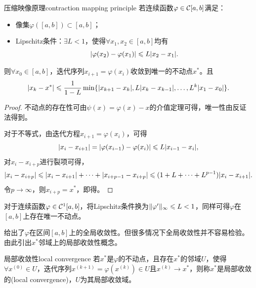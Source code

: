 \begin{theorem}
    {压缩映像原理}{contraction mapping principle}
    若连续函数$\varphi \in \mathcal{C}[a,b]$满足：
    \begin{itemize}
        \item 像集$\varphi([a,b]) \subset [a,b]$；
        \item Lipschitz条件：$\exists L < 1$，使得$\forall x_1,x_2 \in [a,b]$均有
        \begin{equation}\label{eq:na-contraction-condition}
            \lvert\varphi(x_2) - \varphi(x_1)\rvert \leqslant L\lvert x_2 - x_1\rvert.
        \end{equation}
    \end{itemize}
    则$\forall x_0 \in [a,b]$，迭代序列$x_{i+1} = \varphi(x_i)$收敛到唯一的不动点$x^*$。且
    \begin{equation}
            \lvert x_k - x^*\rvert \leqslant \frac1{1 - L}\min\{\lvert x_{k+1} - x_k\rvert,L\lvert x_k - x_{k-1}\rvert,\ldots,L^k\lvert x_1 - x_0\rvert\}.
    \end{equation}
\end{theorem}

\begin{proof}
    不动点的存在性可由$\psi(x) = \varphi(x) - x$的介值定理可得，唯一性由反证法得到。

    对于不等式，由迭代方程$x_{i+1} = \varphi(x_i)$，可得
    \[
        \lvert x_i - x_{i+1}\rvert = \lvert\varphi(x_{i-1}) - \varphi(x_i)\rvert \leqslant L\lvert x_{i-1} - x_i\rvert,
    \]
    对$x_i - x_{i+p}$进行裂项可得，
    \[
        \lvert x_i - x_{i+p}\rvert \leqslant \lvert x_i - x_{i+1}\rvert + \cdots + \lvert x_{i+p-1} - x_{i+p}\rvert \leqslant (1 + L + \cdots + L^{p-1})\lvert x_i - x_{i+1}\rvert.
    \]
    令$p \to \infty$，则$x_{i+p} = x^*$，即得。
\end{proof}

\begin{corollary}
    对于连续函数$\varphi \in \mathcal{C}^1[a,b]$，将Lipschitz条件换为$\lVert\varphi'\rVert_\infty \leqslant L < 1$，同样可得$\varphi$在$[a,b]$上存在唯一不动点。
\end{corollary}

\begin{remark}
     给出了$\varphi$在区间$[a,b]$上的全局收敛性。但很多情况下全局收敛性并不容易检验。由此引出$x^*$邻域上的局部收敛性概念。
\end{remark}

\begin{definition}
    {局部收敛性}{local convergence}
    若$x^*$是$\varphi$的不动点，且存在$x^*$的邻域$U$，使得$\forall x^{(0)} \in U$，迭代序列$x^{(k+1)} = \varphi(x^{(k)}) \in U$且$x^{(k)} \to x^*$，则称$x^*$是局部收敛的(local convergence)，$U$为其局部收敛域。
\end{definition}

